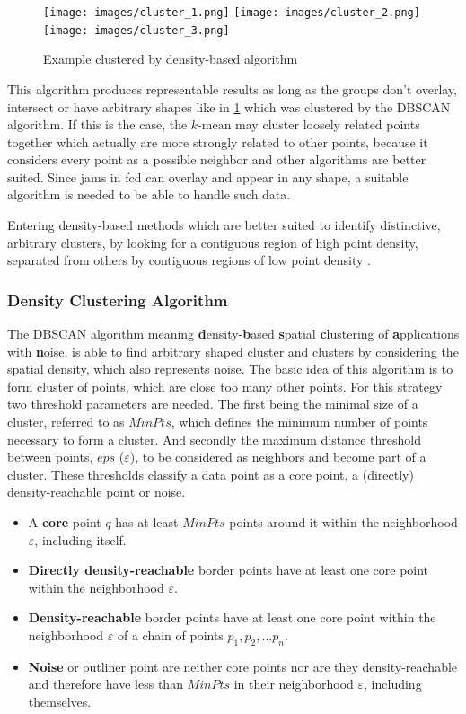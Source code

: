 \begin{figure}[ht!]
	\centering
	\texttt{[image: images/cluster\_1.png]}
	\texttt{[image: images/cluster\_2.png]}
	\texttt{[image: images/cluster\_3.png]}
	\caption{Example clustered by density-based algorithm \parencite{Yildirim2020}}
	\label{cluster_dbscan}
\end{figure}

This algorithm produces representable results as long as the groups don't overlay, intersect or have arbitrary shapes like in \cref{cluster_dbscan} which was clustered by the DBSCAN algorithm. If this is the case, the $k$-mean may cluster loosely related points together which actually are more strongly related to other points, because it considers every point as a possible neighbor and other algorithms are better suited. Since jams in \acrshort{fcd} can overlay and appear in any shape, a suitable algorithm is needed to be able to handle such data.

Entering density-based methods which are better suited to identify distinctive, arbitrary clusters, by looking for a contiguous region of high point density, separated from others by contiguous regions of low point density \parencite{Chauhan2020}. 

\subsubsection{Density Clustering Algorithm}
The DBSCAN algorithm meaning \textbf{d}ensity-\textbf{b}ased \textbf{s}patial \textbf{c}lustering of \textbf{a}pplications with \textbf{n}oise, is able to find arbitrary shaped cluster and clusters by considering the spatial density, which also represents noise. The basic idea of this algorithm is to form cluster of points, which are close too many other points. For this strategy two threshold parameters are needed. The first being the minimal size of a cluster, referred to as $MinPts$, which defines the minimum number of points necessary to form a cluster. And secondly the maximum distance threshold between points, $eps$ ($\varepsilon$), to be considered as neighbors and become part of a cluster. These thresholds classify a data point as a core point, a (directly) density-reachable point or noise. \parencite{Yildirim2020,Chauhan2020,Padro2017}

\begin{itemize}
	\item A \textbf{core} point $q$ has at least $MinPts$ points around it within the neighborhood $\varepsilon$, including itself.
    \item \textbf{Directly density-reachable} border points have at least one core point within the neighborhood $\varepsilon$.
    \item \textbf{Density-reachable} border points have at least one core point within the neighborhood $\varepsilon$ of a chain of points $p_1,p_2,...p_n$.
 	\item \textbf{Noise} or outliner point are neither core points nor are they density-reachable and therefore have less than $MinPts$ in their neighborhood $\varepsilon$, including themselves.
\end{itemize}

